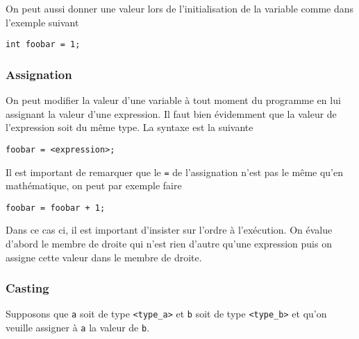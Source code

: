 On peut aussi donner une valeur lors de l'initialisation de la variable
comme dans l'exemple suivant
\begin{lstlisting}
int foobar = 1;
\end{lstlisting}

\subsubsection{Assignation}
On peut modifier la valeur d'une variable à tout moment du programme en lui
assignant la valeur d'une expression. Il faut bien évidemment que la valeur
de l'expression soit du même type. La syntaxe est la suivante
\begin{lstlisting}
foobar = <expression>;
\end{lstlisting}

Il est important de remarquer que le \verb|=| de l'assignation n'est pas le
même qu'en mathématique, on peut par exemple faire
\begin{lstlisting}
foobar = foobar + 1;
\end{lstlisting}

Dans ce cas ci, il est important d'insister sur l'ordre à l'exécution.
On évalue d'abord le membre de droite qui n'est rien d'autre qu'une expression
puis on assigne cette valeur dans le membre de droite.

\subsubsection{Casting}
Supposons que \verb|a| soit de type \verb|<type_a>| et \verb|b| soit de type
\verb|<type_b>| et qu'on veuille assigner à \verb|a| la valeur de \verb|b|.

